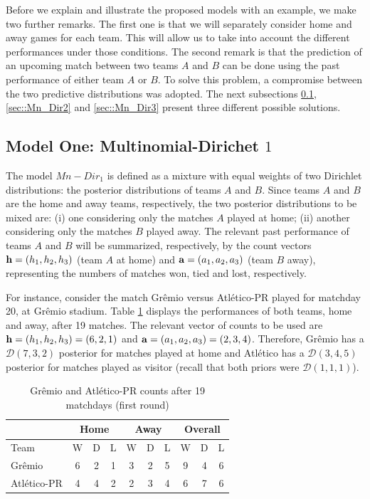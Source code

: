 \documentclass[journal,article,accept,moreauthors,pdftex,12pt,a4paper]{mdpi}
\begin{document}
		Before we explain and illustrate the proposed models with an example, we make two further remarks.
		The first one is that we will separately consider home and away games for each team. This will allow us to take into account the different performances under those conditions.
		The second remark is that the prediction of an upcoming match between two teams $A$ and $B$ can be done using
		the past performance of either team $A$ or $B$.
		To solve this problem, a compromise between the two predictive distributions was adopted. 
		The next subsections \ref{sec::Mn_Dir1}, \ref{sec::Mn_Dir2} and \ref{sec::Mn_Dir3} present three different possible solutions.
		
	\subsection{Model One: Multinomial-Dirichet $1$}
	\label{sec::Mn_Dir1}
	
	The model $Mn-Dir_1$ is defined as a mixture with equal weights of two Dirichlet distributions: the posterior distributions of teams $A$ and $B$. 
	Since teams $A$ and $B$ are the home and away teams, respectively, the two posterior distributions to be mixed are: (i) one considering only the matches $A$ played at home; (ii) another considering only the matches $B$ played away. 
	The relevant past performance of teams $A$ and $B$ will be summarized, respectively, by the count vectors ${\bf h} = (h_1, h_2, h_3)$ (team $A$ at home) and ${\bf a} = (a_1, a_2, a_3)$ (team $B$ away), representing the numbers of matches won, tied and lost, respectively.
	
	For instance, consider the match Gr\^emio versus Atl\'etico-PR played for matchday 20, at Gr\^emio stadium. Table \ref{tab:counts} displays the performances of both teams, home and away, after 19
	matches. The relevant vector of counts to be used are ${\bf h}=(h_1,h_2,h_3)=(6,2,1)$ and ${\bf a}=(a_1,a_2,a_3)=(2,3,4)$. 
	Therefore, Gr\^emio has a $\mathcal{D}(7,3,2)$ posterior for matches played at home and Atl\'etico has a $\mathcal{D}(3,4,5)$ posterior for matches played as visitor (recall that both priors were
	$\mathcal{D}(1,1,1)$).
	
	\begin{table}[!h]
		\begin{center}
			\begin{tabular}{lccccccccc}
				
				\hline
				& \multicolumn{3}{c}{Home} & \multicolumn{3}{c}{Away}& \multicolumn{3}{c}{Overall} \\
				\hline
				\hline
				Team & W & D & L & W & D & L & W & D & L\\
				\hline
				Gr\^emio & 6 & 2 & 1 & 3 & 2 & 5 & 9 & 4 & 6\\
				Atl\'etico-PR & 4 & 4 & 2 & 2 & 3 & 4 & 6 & 7 & 6\\
				\hline
			\end{tabular}
			\caption{Gr\^emio and Atl\'etico-PR counts after 19 matchdays (first round)}\label{tab:counts}
		\end{center}
	\end{table}
	
\end{document}
